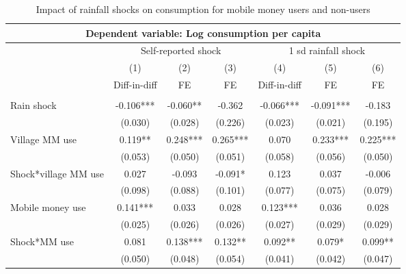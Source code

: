 \begin{table}
\begin{adjustwidth}{-1in}{-1in} 
  \centering
  \caption{Impact of rainfall shocks on consumption for mobile money users and non-users} \label{MM spill}
\begin{tabular}{lcccccc}
\multicolumn{7}{c}{Dependent variable: Log consumption per capita} \\\hline
& \multicolumn{3}{c}{ Self-reported shock} & \multicolumn{3}{c}{1 sd rainfall shock} \\ \cmidrule(r){2-4} \cmidrule(l){5-7}
 & (1) & (2) & (3)  & (4) & (5) & (6)  \\

  & Diff-in-diff & FE & FE & Diff-in-diff & FE & FE \\ \hline
 &  &  &  &  &  &  \\
Rain shock & -0.106*** & -0.060** & -0.362 & -0.066*** & -0.091*** & -0.183   \\
 & (0.030) & (0.028) & (0.226)& (0.023) & (0.021) & (0.195)  \\
Village MM use   & 0.119** & 0.248*** & 0.265*** & 0.070 & 0.233*** & 0.225*** \\
  & (0.053) & (0.050) & (0.051) & (0.058) & (0.056) & (0.050) \\
Shock*village MM use  & 0.027 & -0.093 & -0.091* & 0.123 & 0.037 & -0.006 \\
& (0.098) & (0.088) & (0.101)   & (0.077) & (0.075) & (0.079)  \\
Mobile money use & 0.141*** & 0.033 & 0.028 & 0.123*** & 0.036 & 0.028  \\
 & (0.025) & (0.026) & (0.026) & (0.027) & (0.029) & (0.029) \\
Shock*MM use  & 0.081 & 0.138*** & 0.132**  & 0.092** & 0.079* & 0.099**  \\
  & (0.050) & (0.048) & (0.054) & (0.041) & (0.042) & (0.047) \\


\end{tabular}
\end{adjustwidth}
\end{table}
